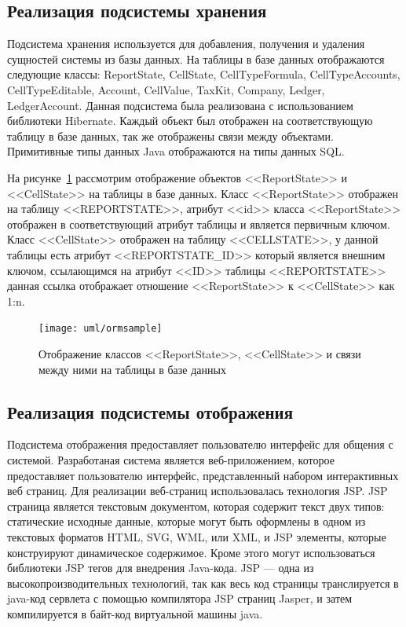 \documentclass[14pt,a4paper]{reportmod}
\begin{document}
\subsection{Реализация подсистемы хранения}

Подсистема хранения используется для добавления, получения и удаления сущностей системы из базы данных. На таблицы в базе данных отображаются следующие классы: ReportState, CellState, CellTypeFormula, CellTypeAccounts, CellTypeEditable, Account, CellValue, TaxKit, Company, Ledger, LedgerAccount. Данная подсистема была реализована с использованием библиотеки Hibernate. Каждый объект был отображен на соответствующую таблицу в базе данных, так же отображены связи между объектами. Примитивные типы данных Java отображаются на типы данных SQL.

На рисунке~\ref{pic:ormsample} рассмотрим отображение объектов <<ReportState>> и\\ <<CellState>> на таблицы в базе данных. Класс <<ReportState>> отображен на таблицу <<REPORTSTATE>>, атрибут <<id>> класса <<ReportState>> отображен в соответствующий атрибут таблицы и является первичным ключом. Класс <<CellState>> отображен на таблицу <<CELLSTATE>>, у данной таблицы есть атрибут <<REPORTSTATE\_ID>> который является внешним ключом, ссылающимся на атрибут <<ID>> таблицы <<REPORTSTATE>> данная ссылка отображает отношение <<ReportState>> к <<CellState>> как 1:n.

\begin{figure}
  \centering
  \texttt{[image: uml/ormsample]}
  \caption{Отображение классов <<ReportState>>, <<CellState>> и связи между ними на таблицы в базе данных}
  \label{pic:ormsample}
\end{figure}


\subsection{Реализация подсистемы отображения}
Подсистема отображения предоставляет пользователю интерфейс для общения с системой. Разработаная система является веб-приложением, которое предоставляет пользователю интерфейс, представленный набором интерактивных веб страниц. Для реализации веб-страниц использовалась технология JSP. JSP страница является текстовым документом, которая содержит текст двух типов: статические исходные данные, которые могут быть оформлены в одном из текстовых форматов HTML, SVG, WML, или XML, и JSP элементы, которые конструируют динамическое содержимое. Кроме этого могут использоваться библиотеки JSP тегов для внедрения Java-кода. JSP --- одна из высокопроизводительных технологий, так как весь код страницы транслируется в java-код сервлета с помощью компилятора JSP страниц Jasper, и затем компилируется в байт-код виртуальной машины java.
\end{document}

